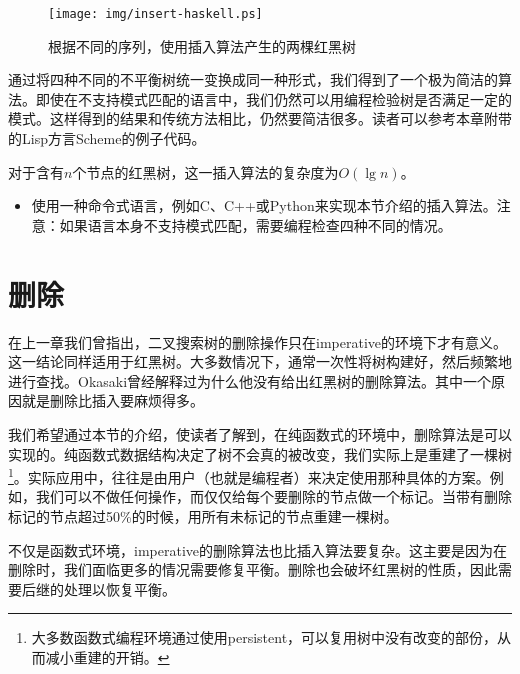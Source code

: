 \documentclass[UTF8]{article}
\begin{document}
\begin{figure}[htbp]
  \centering
  \texttt{[image: img/insert-haskell.ps]}
  \caption{根据不同的序列，使用插入算法产生的两棵红黑树} \label{fig:insert-example}
\end{figure}

通过将四种不同的不平衡树统一变换成同一种形式，我们得到了一个极为简洁的算法。即使在不支持模式匹配的语言中，我们仍然可以用编程检验树是否满足一定的模式。这样得到的结果和传统方法相比，仍然要简洁很多。读者可以参考本章附带的Lisp方言Scheme的例子代码。

对于含有$n$个节点的红黑树，这一插入算法的复杂度为$O(\lg n)$。

\begin{Exercise}

\begin{itemize}
\item 使用一种命令式语言，例如C、C++或Python来实现本节介绍的插入算法。注意：如果语言本身不支持模式匹配，需要编程检查四种不同的情况。
\end{itemize}

\end{Exercise}


\section{删除}

在上一章我们曾指出，二叉搜索树的删除操作只在imperative的环境下才有意义。这一结论同样适用于红黑树。大多数情况下，通常一次性将树构建好，然后频繁地进行查找。Okasaki曾经解释过为什么他没有给出红黑树的删除算法\cite{okasaki-blog}。其中一个原因就是删除比插入要麻烦得多。

我们希望通过本节的介绍，使读者了解到，在纯函数式的环境中，删除算法是可以实现的。纯函数式数据结构决定了树不会真的被改变，我们实际上是重建了一棵树\footnote{大多数函数式编程环境通过使用persistent，可以复用树中没有改变的部份，从而减小重建的开销。}。实际应用中，往往是由用户（也就是编程者）来决定使用那种具体的方案。例如，我们可以不做任何操作，而仅仅给每个要删除的节点做一个标记。当带有删除标记的节点超过50\%的时候，用所有未标记的节点重建一棵树。

不仅是函数式环境，imperative的删除算法也比插入算法要复杂。这主要是因为在删除时，我们面临更多的情况需要修复平衡。删除也会破坏红黑树的性质，因此需要后继的处理以恢复平衡。
\end{document}
